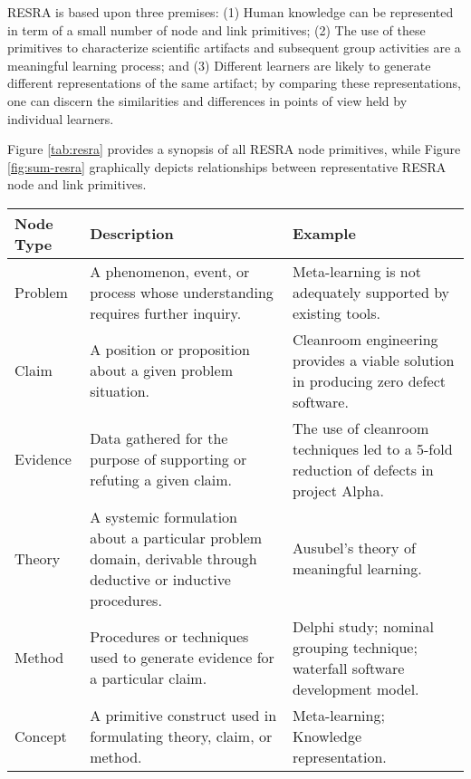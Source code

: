 RESRA is based upon three premises: (1) Human knowledge can be represented
in term of a small number of node and link primitives; (2) The use of these
primitives to characterize scientific artifacts and subsequent group
activities are a meaningful learning process; and (3) Different learners
are likely to generate different representations of the same artifact; by
comparing these representations, one can discern the similarities and
differences in points of view held by individual learners. 

Figure \ref{tab:resra} provides a synopsis of all RESRA node primitives,
while Figure \ref{fig:sum-resra} graphically depicts relationships
between representative RESRA node and link primitives.

\begin{figure*}[htb]
  \begin{center}
    

    \begin{tabular} {|l|p{2.5in}|p{2.5in}|} \hline   
      {\bf Node Type} & {\bf Description} & {\bf Example} \\ \hline \hline
      
      Problem & A phenomenon, event, or process whose understanding
      requires further inquiry. & Meta-learning is not adequately
      supported by existing tools. \\ \hline
      
      Claim & A position or proposition about a given problem
      situation.  & Cleanroom engineering provides a viable solution
      in producing zero defect software. \\ \hline
      
      Evidence & Data gathered for the purpose of supporting or
      refuting a given claim. & The use of cleanroom techniques led
      to a 5-fold reduction of defects in project Alpha. \\
      \hline 

      Theory & A systemic formulation about a particular problem
      domain, derivable through deductive or inductive procedures. &
      Ausubel's theory of meaningful learning. \\ \hline
      
      Method & Procedures or techniques used to generate evidence for
      a particular claim. & Delphi study; nominal grouping technique;
      waterfall software development model. \\ \hline
      
      Concept & A primitive construct used in formulating theory,
      claim, or method. & Meta-learning; Knowledge representation.
      \\ \hline
      

\end{tabular}
\end{center}
\end{figure*}
